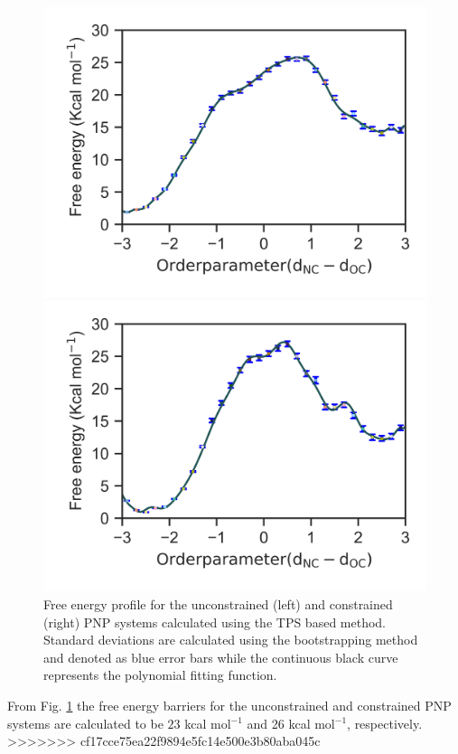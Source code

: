 \documentclass[notitlepage,preprint,%
amssymb,amsmath,
 aip,jcp%
]{revtex4-1}
\begin{document}
\begin{figure}[ht!]
  \centering
  \begin{minipage}[b]{0.48\linewidth}
    \includegraphics[scale=1.0]{figures/pnp-uncons-fenergy.png}
  \end{minipage}
  \quad
  \begin{minipage}[b]{0.48\linewidth}
    \includegraphics[scale=1.0]{figures/pnp-cons-fenergy.png}
  \end{minipage}
  \caption{Free energy profile for the unconstrained (left) and constrained (right) PNP systems 
  calculated using the TPS based method. Standard deviations are calculated using the bootstrapping 
method and denoted as blue error bars while the continuous black curve represents the polynomial 
fitting function.}
\label{fig:fenergy}
\end{figure}

From Fig. \ref{fig:fenergy} the free energy barriers for the unconstrained and constrained PNP systems 
are calculated to be $23$ kcal mol$^{-1}$ and 26 kcal mol$^{-1}$, respectively. 
>>>>>>> cf17cce75ea22f9894e5fc14e500e3b80aba045c

%

\end{document}
